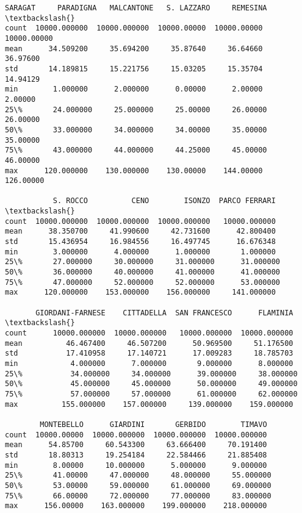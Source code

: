 \documentclass[11pt]{article}
\begin{document}
\begin{tcolorbox}[breakable, size=fbox, boxrule=.5pt, pad at break*=1mm, opacityfill=0]
\begin{Verbatim}[commandchars=\\\{\}]
            SARAGAT     PARADIGNA   MALCANTONE   S. LAZZARO     REMESINA  \textbackslash{}
count  10000.000000  10000.000000  10000.00000  10000.00000  10000.00000
mean      34.509200     35.694200     35.87640     36.64660     36.97600
std       14.189815     15.221756     15.03205     15.35704     14.94129
min        1.000000      2.000000      0.00000      2.00000      2.00000
25\%       24.000000     25.000000     25.00000     26.00000     26.00000
50\%       33.000000     34.000000     34.00000     35.00000     35.00000
75\%       43.000000     44.000000     44.25000     45.00000     46.00000
max      120.000000    130.000000    130.00000    144.00000    126.00000

           S. ROCCO          CENO        ISONZO  PARCO FERRARI  \textbackslash{}
count  10000.000000  10000.000000  10000.000000   10000.000000
mean      38.350700     41.990600     42.731600      42.800400
std       15.436954     16.984556     16.497745      16.676348
min        3.000000      4.000000      1.000000       1.000000
25\%       27.000000     30.000000     31.000000      31.000000
50\%       36.000000     40.000000     41.000000      41.000000
75\%       47.000000     52.000000     52.000000      53.000000
max      120.000000    153.000000    156.000000     141.000000

       GIORDANI-FARNESE    CITTADELLA  SAN FRANCESCO      FLAMINIA  \textbackslash{}
count      10000.000000  10000.000000   10000.000000  10000.000000
mean          46.467400     46.507200      50.969500     51.176500
std           17.410958     17.140721      17.009283     18.785703
min            4.000000      7.000000       9.000000      8.000000
25\%           34.000000     34.000000      39.000000     38.000000
50\%           45.000000     45.000000      50.000000     49.000000
75\%           57.000000     57.000000      61.000000     62.000000
max          155.000000    157.000000     139.000000    159.000000

        MONTEBELLO      GIARDINI       GERBIDO        TIMAVO
count  10000.00000  10000.000000  10000.000000  10000.000000
mean      54.85700     60.543300     63.666400     70.191400
std       18.80313     19.254184     22.584466     21.885408
min        8.00000     10.000000      5.000000      9.000000
25\%       41.00000     47.000000     48.000000     55.000000
50\%       53.00000     59.000000     61.000000     69.000000
75\%       66.00000     72.000000     77.000000     83.000000
max      156.00000    163.000000    199.000000    218.000000
\end{Verbatim}
\end{tcolorbox}
        
\end{document}
